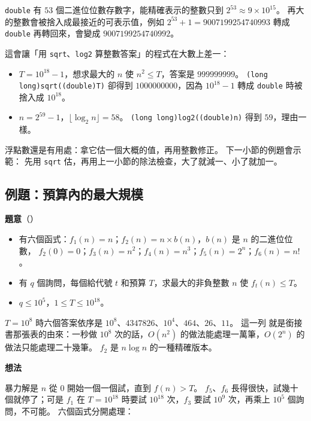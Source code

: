 \texttt{double} 有 $53$ 個二進位位數存數字，能精確表示的整數只到
$2^{53} \approx 9 \times 10^{15}$。 再大的整數會被捨入成最接近的可表示值，例如
$2^{53} + 1 = 9007199254740993$ 轉成 \texttt{double} 再轉回來，會變成
$9007199254740992$。

這會讓「用 \texttt{sqrt}、\texttt{log2} 算整數答案」的程式在大數上差一：

\begingroup\sloppy
\begin{itemize}
\item $T = 10^{18} - 1$，想求最大的 $n$ 使 $n^2 \le T$，答案是 $999999999$。
\texttt{(long long)sqrt((double)T)} 卻得到 $1000000000$，因為 $10^{18} - 1$ 轉成
\texttt{double} 時被捨入成 $10^{18}$。
\item $n = 2^{59} - 1$，$\lfloor \log_2 n \rfloor = 58$。
\texttt{(long long)log2((double)n)} 得到 $59$，理由一樣。
\end{itemize}
\endgroup

浮點數還是有用處：拿它估一個大概的值，再用整數修正。 下一小節的例題會示範：
先用 \texttt{sqrt} 估，再用上一小節的除法檢查，大了就減一、小了就加一。

\subsection{例題：預算內的最大規模}
\label{sec:ex-max-size}

\textbf{題意}（）

\begin{itemize}
\item 有六個函式：$f_1(n) = n$；$f_2(n) = n \times b(n)$，$b(n)$ 是 $n$ 的二進位位數，
$f_2(0) = 0$；$f_3(n) = n^2$；$f_4(n) = n^3$；$f_5(n) = 2^n$；$f_6(n) = n!$。
\item 有 $q$ 個詢問，每個給代號 $t$ 和預算 $T$，求最大的非負整數 $n$ 使
$f_t(n) \le T$。
\item $q \le 10^5$，$1 \le T \le 10^{18}$。
\end{itemize}

$T = 10^8$ 時六個答案依序是 $10^8$、$4347826$、$10^4$、$464$、$26$、$11$。 這一列
就是銜接書那張表的由來：一秒做 $10^8$ 次的話，$O(n^2)$ 的做法能處理一萬筆，$O(2^n)$
的做法只能處理二十幾筆。 $f_2$ 是 $n \log n$ 的一種精確版本。

\textbf{想法}

暴力解是 $n$ 從 $0$ 開始一個一個試，直到 $f(n) > T$。 $f_5$、$f_6$ 長得很快，試幾十
個就停了；可是 $f_1$ 在 $T = 10^{18}$ 時要試 $10^{18}$ 次，$f_3$ 要試 $10^9$ 次，再乘上
$10^5$ 個詢問，不可能。 六個函式分開處理：

